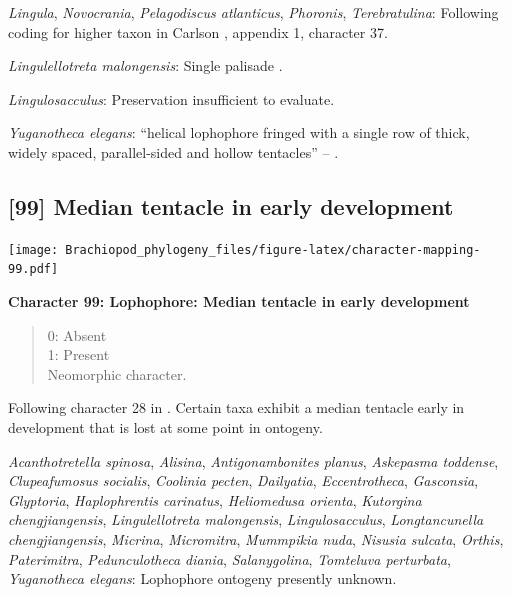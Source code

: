 \documentclass[openany]{book}
\theoremstyle{definition}
\theoremstyle{definition}
\theoremstyle{definition}
\theoremstyle{remark}
\begin{document}
\hypertarget{Lingula-coding-98}{}
\emph{Lingula}, \emph{Novocrania}, \emph{Pelagodiscus atlanticus},
\emph{Phoronis}, \emph{Terebratulina}: Following coding for higher taxon
in Carlson \citeyearpar{Carlson1995Phylogeneticrelationships}, appendix
1, character 37.

\hypertarget{Lingulellotreta_malongensis-coding-98}{}
\emph{Lingulellotreta malongensis}: Single palisade
\citep{Zhang2004Newdata}.

\hypertarget{Lingulosacculus-coding-98}{}
\emph{Lingulosacculus}: Preservation insufficient to evaluate.

\hypertarget{Yuganotheca_elegans-coding-98}{}
\emph{Yuganotheca elegans}: ``helical lophophore fringed with a single
row of thick, widely spaced, parallel-sided and hollow tentacles'' --
\citet{Zhang2014Anearly}.

\subsection*{{[}99{]} Median tentacle in early
development}\label{median-tentacle-in-early-development}

\texttt{[image: Brachiopod\_phylogeny\_files/figure-latex/character-mapping-99.pdf]}

\textbf{Character 99: Lophophore: Median tentacle in early development}

\begin{quote}
0: Absent\\
1: Present\\
Neomorphic character.
\end{quote}

Following character 28 in \citet{Carlson1995Phylogeneticrelationships}.
Certain taxa exhibit a median tentacle early in development that is lost
at some point in ontogeny.

\hypertarget{Acanthotretella_spinosa-coding-99}{}
\emph{Acanthotretella spinosa}, \emph{Alisina}, \emph{Antigonambonites
planus}, \emph{Askepasma toddense}, \emph{Clupeafumosus socialis},
\emph{Coolinia pecten}, \emph{Dailyatia}, \emph{Eccentrotheca},
\emph{Gasconsia}, \emph{Glyptoria}, \emph{Haplophrentis carinatus},
\emph{Heliomedusa orienta}, \emph{Kutorgina chengjiangensis},
\emph{Lingulellotreta malongensis}, \emph{Lingulosacculus},
\emph{Longtancunella chengjiangensis}, \emph{Micrina},
\emph{Micromitra}, \emph{Mummpikia nuda}, \emph{Nisusia sulcata},
\emph{Orthis}, \emph{Paterimitra}, \emph{Pedunculotheca diania},
\emph{Salanygolina}, \emph{Tomteluva perturbata}, \emph{Yuganotheca
elegans}: Lophophore ontogeny presently unknown.
\end{document}
